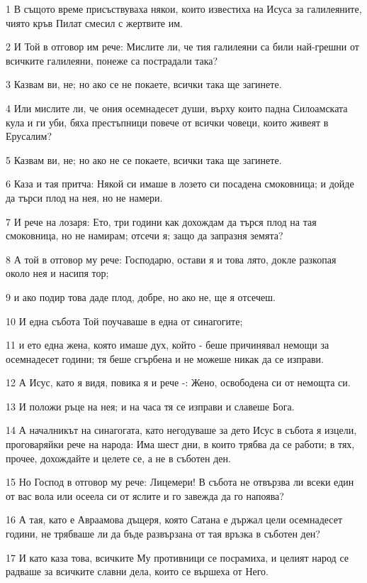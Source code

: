 \par 1 В същото време присъствуваха някои, които известиха на Исуса за галилеяните, чиято кръв Пилат смесил с жертвите им.
\par 2 И Той в отговор им рече: Мислите ли, че тия галилеяни са били най-грешни от всичките галилеяни, понеже са пострадали така?
\par 3 Казвам ви, не; но ако се не покаете, всички така ще загинете.
\par 4 Или мислите ли, че ония осемнадесет души, върху които падна Силоамската кула и ги уби, бяха престъпници повече от всички човеци, които живеят в Ерусалим?
\par 5 Казвам ви, не; но ако не се покаете, всички така ще загинете.
\par 6 Каза и тая притча: Някой си имаше в лозето си посадена смоковница; и дойде да търси плод на нея, но не намери.
\par 7 И рече на лозаря: Ето, три години как дохождам да търся плод на тая смоковница, но не намирам; отсечи я; защо да запразня земята?
\par 8 А той в отговор му рече: Господарю, остави я и това лято, докле разкопая около нея и насипя тор;
\par 9 и ако подир това даде плод, добре, но ако не, ще я отсечеш.
\par 10 И една събота Той поучаваше в една от синагогите;
\par 11 и ето една жена, която имаше дух, който - беше причинявал немощи за осемнадесет години; тя беше сгърбена и не можеше никак да се изправи.
\par 12 А Исус, като я видя, повика я и рече -: Жено, освободена си от немощта си.
\par 13 И положи ръце на нея; и на часа тя се изправи и славеше Бога.
\par 14 А началникът на синагогата, като негодуваше за дето Исус в събота я изцели, проговаряйки рече на народа: Има шест дни, в които трябва да се работи; в тях, прочее, дохождайте и целете се, а не в съботен ден.
\par 15 Но Господ в отговор му рече: Лицемери! В събота не отвързва ли всеки един от вас вола или осеела си от яслите и го завежда да го напоява?
\par 16 А тая, като е Авраамова дъщеря, която Сатана е държал цели осемнадесет години, не трябваше ли да бъде развързана от тая връзка в съботен ден?
\par 17 И като каза това, всичките Му противници се посрамиха, и целият народ се радваше за всичките славни дела, които се вършеха от Него.
